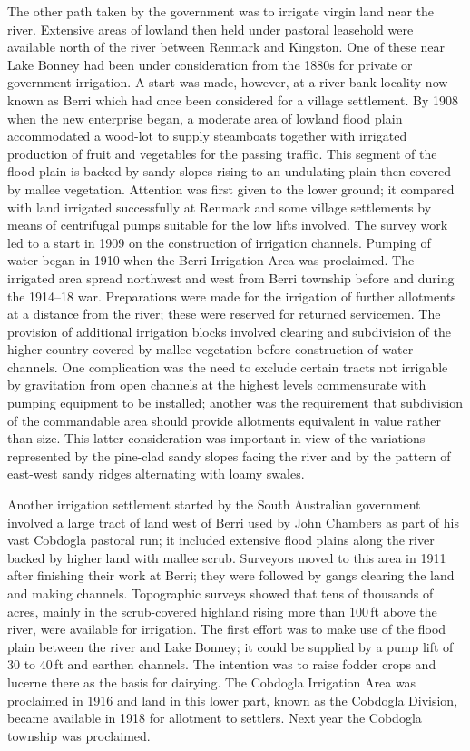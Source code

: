 The other path taken by the government was to irrigate virgin land
near the river.  Extensive areas of lowland then held under pastoral
leasehold were available north of the river between Renmark and
Kingston.  One of these near Lake Bonney had been under consideration
from the 1880s for private or government irrigation.  A start was
made, however, at a river-bank locality now known as Berri which had
once been considered for a village settlement.  By 1908 when the new
enterprise began, a moderate area of lowland flood plain accommodated
a wood-lot to supply steamboats together with irrigated production of
fruit and vegetables for the passing traffic.  This segment of the
flood plain is backed by sandy slopes rising to an undulating plain
then covered by mallee vegetation.  Attention was first given to the
lower ground; it compared with land irrigated successfully at Renmark
and some village settlements by means of centrifugal pumps suitable
for the low lifts involved.  The survey work led to a start in 1909 on
the construction of irrigation channels.  Pumping of water began in
1910 when the Berri Irrigation Area was proclaimed.  The irrigated
area spread northwest and west from Berri township before and during
the 1914--18 war. Preparations were made for the irrigation of further
allotments at a distance from the river; these were reserved for
returned servicemen.  The provision of additional irrigation blocks
involved clearing and subdivision of the higher country covered by
mallee vegetation before construction of water channels.  One
complication was the need to exclude certain tracts not irrigable by
gravitation from open channels at the highest levels commensurate with
pumping equipment to be installed; another was the requirement that
subdivision of the commandable area should provide allotments
equivalent in value rather than size.  This latter consideration was
important in view of the variations represented by the pine-clad sandy
slopes facing the river and by the pattern of east-west sandy ridges
alternating with loamy swales.

Another irrigation settlement started by the South Australian
government involved a large tract of land west of Berri used by John
Chambers as part of his vast Cobdogla pastoral run; it included
extensive flood plains along the river backed by higher land with
mallee scrub.  Surveyors moved to this area in 1911 after finishing
their work at Berri; they were followed by gangs clearing the land and
making channels.  Topographic surveys showed that tens of thousands of
acres, mainly in the scrub-covered highland rising more than 100\,ft
above the river, were available for irrigation.  The first effort was
to make use of the flood plain between the river and Lake Bonney; it
could be supplied by a pump lift of 30 to 40\,ft and earthen
channels. The intention was to raise fodder crops and lucerne there as
the basis for dairying.  The Cobdogla Irrigation Area was proclaimed
in 1916 and land in this lower part, known as the Cobdogla Division,
became available in 1918 for allotment to settlers. Next year the
Cobdogla township was proclaimed.

